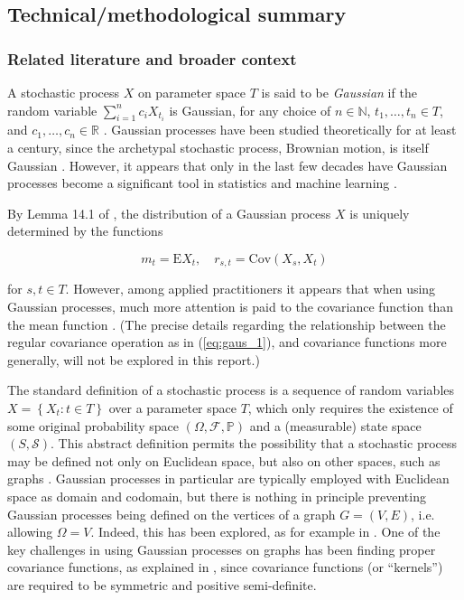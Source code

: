 \newpage
\subsection{Technical/methodological summary}

\subsubsection{Related literature and broader context}


A stochastic process $X$ on parameter space $T$ is said to be \textit{Gaussian} if the random variable $\sum_{i = 1}^n c_i X_{t_i}$ is Gaussian, for any choice of $n \in \mathbb N$, $t_1, \dots, t_n \in T$, and $c_1, \dots, c_n \in \mathbb R$ \cite{kallenberg}. Gaussian processes have been studied theoretically for at least a century, since the archetypal stochastic process, Brownian motion, is itself Gaussian \cite{kallenberg}. However, it appears that only in the last few decades have Gaussian processes become a significant tool in statistics and machine learning \cite{rw}.

By Lemma 14.1 of \cite{kallenberg}, the distribution of a Gaussian process $X$ is uniquely determined by the functions

\begin{equation}\label{eq:gaus_1}
    m_t = \mathrm E X_t, \quad r_{s, t} = \text{Cov}(X_s, X_t)
\end{equation}

for $s, t \in T$. However, among applied practitioners it appears that when using Gaussian processes, much more attention is paid to the covariance function than the mean function \cite{garnett_bayesoptbook_2023}. (The precise details regarding the relationship between the regular covariance operation as in (\ref{eq:gaus_1}), and covariance functions more generally, will not be explored in this report.)

The standard definition of a stochastic process is a sequence of random variables $X = \left\{ X_t \colon t \in T \right\}$ over a parameter space $T$, which only requires the existence of some original probability space $\left( \Omega, \mathcal F, \mathbb P \right)$ and a (measurable) state space $(S, \mathcal S)$. This abstract definition permits the possibility that a stochastic process may be defined not only on Euclidean space, but also on other spaces, such as graphs \cite{grimmett}. Gaussian processes in particular are typically employed with Euclidean space as domain and codomain, but there is nothing in principle preventing Gaussian processes being defined on the vertices of a graph $G = (V, E)$, i.e. allowing $\Omega = V$. Indeed, this has been explored, as for example in \cite{kondor2002diffusion}. One of the key challenges in using Gaussian processes on graphs has been finding proper covariance functions, as explained in \cite{kondor2002diffusion}, since covariance functions (or ``kernels'') are required to be symmetric and positive semi-definite.

